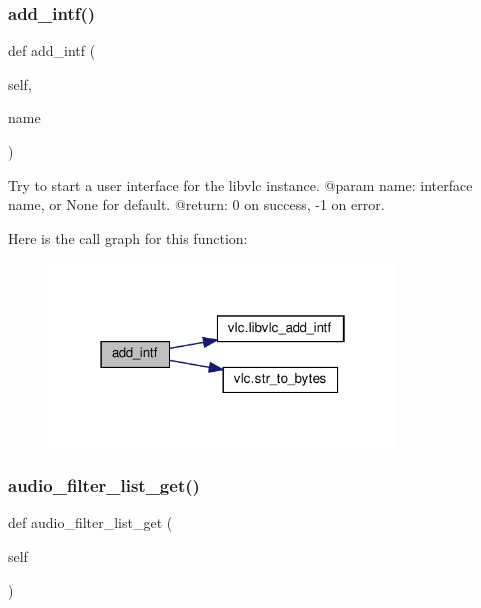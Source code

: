 \subsubsection{\texorpdfstring{add\+\_\+intf()}{add\_intf()}}
{\footnotesize\ttfamily def add\+\_\+intf (\begin{DoxyParamCaption}\item[{}]{self,  }\item[{}]{name }\end{DoxyParamCaption})}

\begin{DoxyVerb}Try to start a user interface for the libvlc instance.
@param name: interface name, or None for default.
@return: 0 on success, -1 on error.
\end{DoxyVerb}
 Here is the call graph for this function\+:
\nopagebreak
\begin{figure}[H]
\begin{center}
\leavevmode
\includegraphics[width=262pt]{classvlc_1_1_instance_a2f16d4ca3ce5f13e304911d652e8bf6c_cgraph}
\end{center}
\end{figure}
\mbox{\label{classvlc_1_1_instance_a267774a685e64a5f8f666a4b6f8ac85f}} 
\subsubsection{\texorpdfstring{audio\+\_\+filter\+\_\+list\+\_\+get()}{audio\_filter\_list\_get()}}
{\footnotesize\ttfamily def audio\+\_\+filter\+\_\+list\+\_\+get (\begin{DoxyParamCaption}\item[{}]{self }\end{DoxyParamCaption})}

